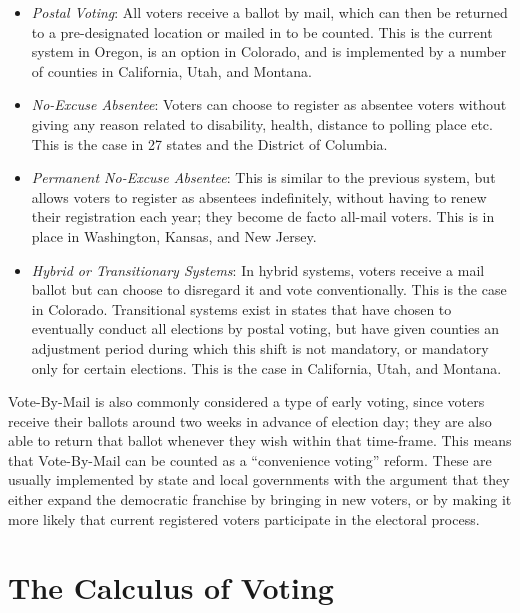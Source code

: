 \documentclass[12pt,twoside]{reedthesis}
\providecommand{\tightlist}{%
  \setlength{\itemsep}{0pt}\setlength{\parskip}{0pt}}
\begin{document}
  \begin{itemize}
  \tightlist
  \item
    \emph{Postal Voting}: All voters receive a ballot by mail, which can
    then be returned to a pre-designated location or mailed in to be
    counted. This is the current system in Oregon, is an option in
    Colorado, and is implemented by a number of counties in California,
    Utah, and Montana.\\
  \item
    \emph{No-Excuse Absentee}: Voters can choose to register as absentee
    voters without giving any reason related to disability, health,
    distance to polling place etc. This is the case in 27 states and the
    District of Columbia.\\
  \item
    \emph{Permanent No-Excuse Absentee}: This is similar to the previous
    system, but allows voters to register as absentees indefinitely,
    without having to renew their registration each year; they become de
    facto all-mail voters. This is in place in Washington, Kansas, and New
    Jersey.\\
  \item
    \emph{Hybrid or Transitionary Systems}: In hybrid systems, voters
    receive a mail ballot but can choose to disregard it and vote
    conventionally. This is the case in Colorado. Transitional systems
    exist in states that have chosen to eventually conduct all elections
    by postal voting, but have given counties an adjustment period during
    which this shift is not mandatory, or mandatory only for certain
    elections. This is the case in California, Utah, and Montana.
  \end{itemize}
  
  Vote-By-Mail is also commonly considered a type of early voting, since
  voters receive their ballots around two weeks in advance of election
  day; they are also able to return that ballot whenever they wish within
  that time-frame. This means that Vote-By-Mail can be counted as a
  ``convenience voting'' reform. These are usually implemented by state
  and local governments with the argument that they either expand the
  democratic franchise by bringing in new voters, or by making it more
  likely that current registered voters participate in the electoral
  process.
  
  \section{The Calculus of Voting}\label{the-calculus-of-voting}
  
\end{document}
